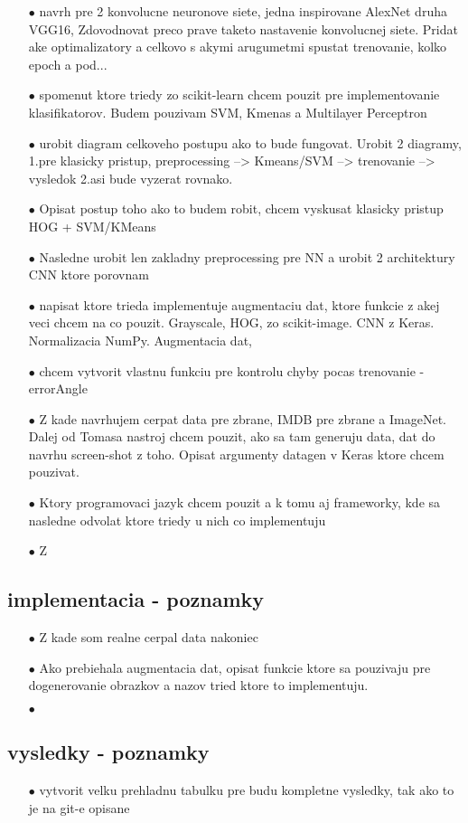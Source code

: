 \begin{enumerate}
    \item[$\bullet$] navrh pre 2 konvolucne neuronove siete, jedna inspirovane AlexNet druha VGG16,
    Zdovodnovat preco prave taketo nastavenie konvolucnej siete.
    Pridat ake optimalizatory a celkovo s akymi arugumetmi spustat trenovanie, kolko epoch a pod...
    \item[$\bullet$] spomenut ktore triedy zo scikit-learn chcem pouzit pre implementovanie klasifikatorov.
    Budem pouzivam SVM, Kmenas a Multilayer Perceptron
    \item[$\bullet$] urobit diagram celkoveho postupu ako to bude fungovat.
    Urobit 2 diagramy, 1.pre klasicky pristup, preprocessing --> Kmeans/SVM --> trenovanie --> vysledok 2.asi bude vyzerat rovnako.
    \item[$\bullet$] Opisat postup toho ako to budem robit, chcem vyskusat klasicky pristup HOG + SVM/KMeans
    \item[$\bullet$] Nasledne urobit len zakladny preprocessing pre NN a urobit 2 architektury CNN ktore porovnam
    \item[$\bullet$] napisat ktore trieda implementuje augmentaciu dat, ktore funkcie z akej veci chcem na co pouzit.
    Grayscale, HOG, zo scikit-image. CNN z Keras. Normalizacia NumPy. Augmentacia dat, 
    \item[$\bullet$] chcem vytvorit vlastnu funkciu pre kontrolu chyby pocas trenovanie - errorAngle
    \item[$\bullet$] Z kade navrhujem cerpat data pre zbrane, IMDB pre zbrane a ImageNet.
    Dalej od Tomasa nastroj chcem pouzit, ako sa tam generuju data, dat do navrhu screen-shot z toho.
    Opisat argumenty datagen v Keras ktore chcem pouzivat.
    \item[$\bullet$] Ktory programovaci jazyk chcem pouzit a k tomu aj frameworky, kde sa nasledne odvolat ktore triedy u nich co implementuju
    \item[$\bullet$] Z
\end{enumerate}

\subsection{implementacia - poznamky}
\begin{enumerate}
    \item[$\bullet$] Z kade som realne cerpal data nakoniec
    \item[$\bullet$] Ako prebiehala augmentacia dat, opisat funkcie ktore sa pouzivaju pre dogenerovanie obrazkov a nazov tried ktore to implementuju.
    \item[$\bullet$] 
\end{enumerate}

\subsection{vysledky - poznamky}

\begin{enumerate}
    \item[$\bullet$] vytvorit velku prehladnu tabulku pre budu kompletne vysledky, tak ako to je na git-e opisane
\end{enumerate}
